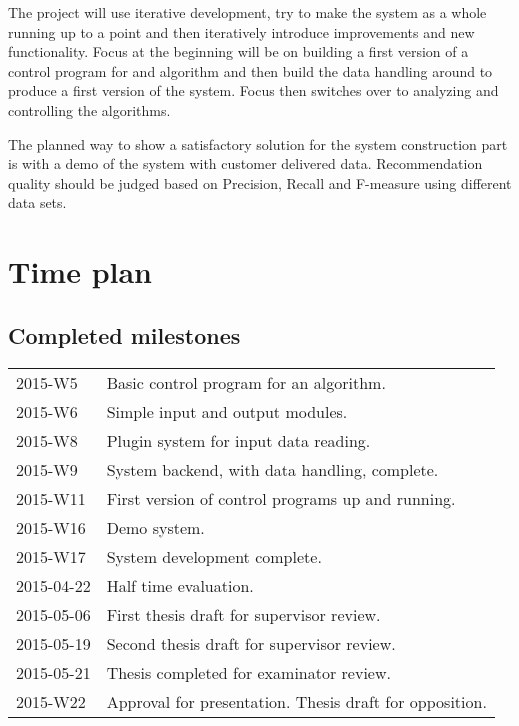 \documentclass[11pt]{article}
\begin{document}
The project will use iterative development, try to make the system as a whole running up to a point and then iteratively introduce improvements and new functionality. Focus at the beginning will be on building a first version of a control program for and algorithm and then build the data handling around to produce a first version of the system. Focus then switches over to analyzing and controlling the algorithms.

The planned way to show a satisfactory solution for the system construction part is with a demo of the system with customer delivered data. Recommendation quality should be judged based on Precision, Recall and F-measure using different data sets.

\newpage


\section*{Time plan}

\subsection*{Completed milestones}

\begin{tabular}{l l}
    2015-W5     & Basic control program for an algorithm.  \\
    2015-W6     & Simple input and output modules.  \\
    2015-W8     & Plugin system for input data reading.  \\
    2015-W9     & System backend, with data handling, complete.  \\
    2015-W11    & First version of control programs up and running. \\
    2015-W16    & Demo system. \\
    2015-W17    & System development complete. \\
    2015-04-22  & Half time evaluation. \\ %
    2015-05-06  & First thesis draft for supervisor review. \\
    2015-05-19  & Second thesis draft for supervisor review. \\
    2015-05-21  & Thesis completed for examinator review.\\
    2015-W22    & Approval for presentation. Thesis draft for opposition.\\
\end{tabular}
\end{document}

